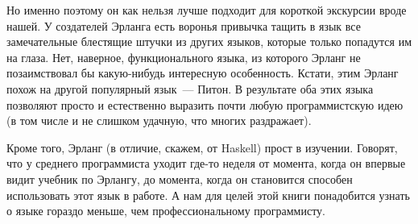 \documentclass[
  paper=a4,
  fontsize=14pt,
  openany,
  appendixprefix=true
]{scrbook}
\begin{document}
Но именно поэтому он как нельзя лучше подходит для короткой экскурсии вроде нашей. У создателей Эрланга есть воронья привычка тащить в язык все замечательные блестящие штучки из других языков, которые только попадутся им на глаза. Нет, наверное, функционального языка, из которого Эрланг не позаимствовал бы какую-нибудь интересную особенность. Кстати, этим Эрланг похож на другой популярный язык~--- Питон. В результате оба этих языка позволяют просто и естественно выразить почти любую программистскую идею (в том числе и не слишком удачную, что многих раздражает).

Кроме того, Эрланг (в отличие, скажем, от Haskell) прост в изучении. Говорят, что у среднего программиста уходит где-то неделя от момента, когда он впервые видит учебник по Эрлангу, до момента, когда он становится способен использовать этот язык в работе. А нам для целей этой книги понадобится узнать о языке гораздо меньше, чем профессиональному программисту.
\end{document}

